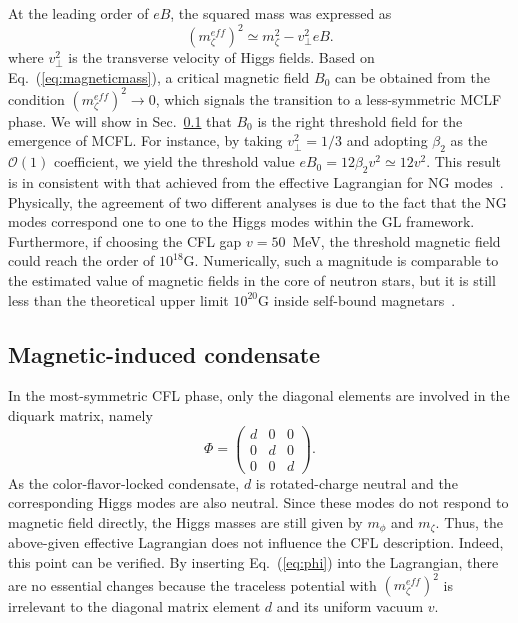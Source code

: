 At the leading order of $eB$, the squared mass was expressed as~\cite{zhang2015magnetic}
\begin{equation}
\label{eq:magneticmass}
(m_\zeta^{eff})^2 \simeq m_\zeta^2 - v_\perp^2eB.
\end{equation}
where $v_\perp^2$ is the transverse velocity of Higgs fields.
Based on Eq.~(\ref{eq:magneticmass}), a critical magnetic field $B_0$ can be obtained from the condition $(m_\zeta^{eff})^2 \rightarrow 0$, which signals the transition to a less-symmetric
MCLF phase. We will show in Sec.~\ref{sssec:2} that $B_0$ is the right threshold field for the emergence of MCFL.
For instance, by taking $v_\perp^2=1/3$ and adopting $\beta_2$ as
the $\mathscr{O}(1)$ coefficient, we yield the threshold value $eB_0 = 12\beta_2 v^2 \simeq 12v^2$.
This result is in consistent with that achieved from the effective Lagrangian for NG
modes~\cite{ferrer2007magnetic}. Physically, the agreement of two different analyses is due to
the fact that the NG modes correspond one to one to the Higgs modes within the GL framework.
Furthermore, if choosing the CFL gap $v = 50$~MeV, the threshold magnetic field could reach the
order of $10^{18}\text{G}$. Numerically, such a magnitude is comparable to the estimated value of
magnetic fields in the core of neutron stars, but it is still less than the theoretical upper
limit $10^{20}\text{G}$ inside self-bound magnetars~\cite{dong2001,lai1991cold}.
\subsection{Magnetic-induced condensate }
\label{sssec:2}

In the most-symmetric CFL phase, only the diagonal elements are involved in the diquark matrix, namely
\begin{equation}
  \label{eq:phi}
  \Phi =
  \begin{pmatrix}
    d & 0 & 0 \\
    0 & d & 0 \\
    0 & 0 & d
    \end{pmatrix}.\end{equation}
As the color-flavor-locked condensate, $d$ is rotated-charge neutral and the corresponding Higgs
modes are also neutral. Since these modes do not respond to magnetic field directly, the Higgs
masses are still given by $m_\phi$ and $m_\zeta$. Thus, the above-given effective Lagrangian does
not influence the CFL description. Indeed, this point can be verified. By inserting Eq.~(\ref{eq:phi})
into the Lagrangian, there are no essential changes because the traceless potential with
$(m_\zeta^{eff})^2$ is irrelevant to the diagonal matrix element $d$ and its uniform vacuum $v$.

